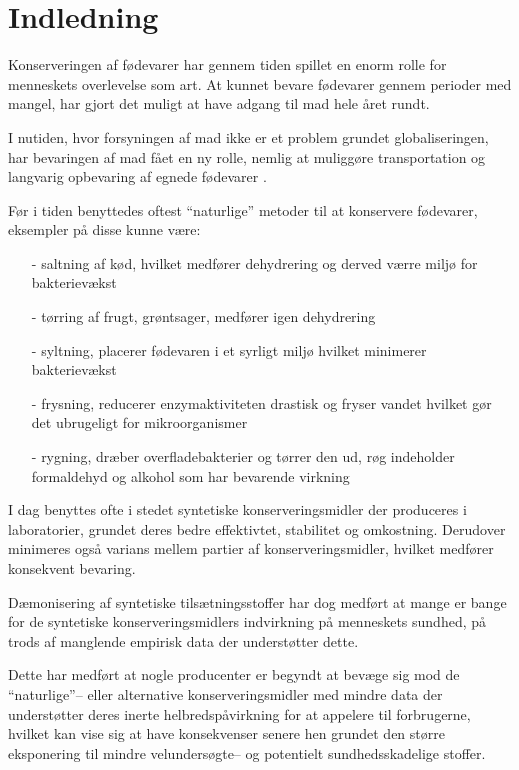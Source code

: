 \section{Indledning}
    Konserveringen af fødevarer har gennem tiden spillet en enorm rolle for menneskets overlevelse som art. At kunnet bevare fødevarer gennem perioder med mangel, har gjort det muligt at have adgang til mad hele året rundt. 

    I nutiden, hvor forsyningen af mad ikke er et problem grundet globaliseringen, har bevaringen af mad fået en ny rolle, nemlig at muliggøre transportation og langvarig opbevaring af egnede fødevarer \parencite{Elis2019}.

    Før i tiden benyttedes oftest ``naturlige'' metoder til at konservere fødevarer, eksempler på disse kunne være: 
    \begin{itemize}
        \item[-] saltning af kød, hvilket medfører dehydrering og derved værre miljø for bakterievækst
        \item[-] tørring af frugt, grøntsager, medfører igen dehydrering
        \item[-] syltning, placerer fødevaren i et syrligt miljø hvilket minimerer bakterievækst
        \item[-] frysning, reducerer enzymaktiviteten drastisk og fryser vandet hvilket gør det ubrugeligt for mikroorganismer
        \item[-] rygning, dræber overfladebakterier og tørrer den ud, røg indeholder formaldehyd og alkohol som har bevarende virkning
    \end{itemize}
    I dag benyttes ofte i stedet syntetiske konserveringsmidler der produceres i laboratorier, grundet deres bedre effektivtet, stabilitet og omkostning. Derudover minimeres også varians mellem partier af konserveringsmidler, hvilket medfører konsekvent bevaring.

    Dæmonisering af syntetiske tilsætningsstoffer har dog medført at mange er bange for de syntetiske konserveringsmidlers indvirkning på menneskets sundhed, på trods af manglende empirisk data der understøtter dette. 

    Dette har medført at nogle producenter er begyndt at bevæge sig mod de ``naturlige''-- eller alternative konserveringsmidler med mindre data der understøtter deres inerte helbredspåvirkning for at appelere til forbrugerne, hvilket kan vise sig at have konsekvenser senere hen grundet den større eksponering til mindre velundersøgte-- og potentielt sundhedsskadelige stoffer.

